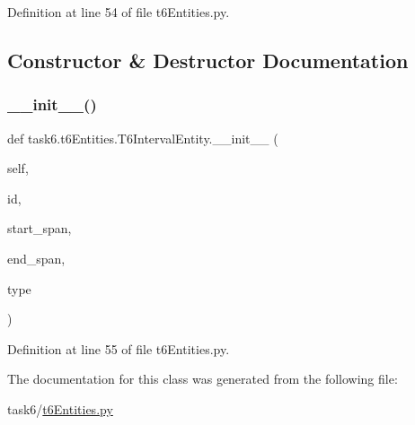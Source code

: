 Definition at line 54 of file t6\+Entities.\+py.



\subsection{Constructor \& Destructor Documentation}
\mbox{\label{classtask6_1_1t6Entities_1_1T6IntervalEntity_ac60a5e79fc1417b2447c865deeef4884}} 
\subsubsection{\texorpdfstring{\+\_\+\+\_\+init\+\_\+\+\_\+()}{\_\_init\_\_()}}
{\footnotesize\ttfamily def task6.\+t6\+Entities.\+T6\+Interval\+Entity.\+\_\+\+\_\+init\+\_\+\+\_\+ (\begin{DoxyParamCaption}\item[{}]{self,  }\item[{}]{id,  }\item[{}]{start\+\_\+span,  }\item[{}]{end\+\_\+span,  }\item[{}]{type }\end{DoxyParamCaption})}



Definition at line 55 of file t6\+Entities.\+py.



The documentation for this class was generated from the following file\+:\begin{DoxyCompactItemize}
\item 
task6/\hyperlink{t6Entities_8py}{t6\+Entities.\+py}\end{DoxyCompactItemize}
